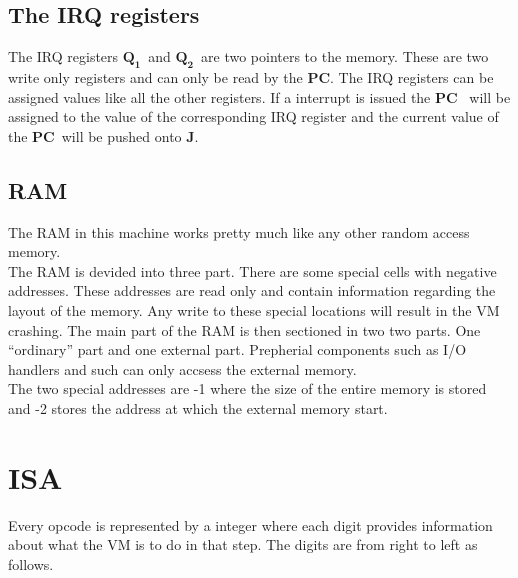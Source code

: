 \documentclass{article}
\newcommand{\q}{$\textbf{Q}_{\textbf{1}}$}
\newcommand{\qq}{$\textbf{Q}_{\textbf{2}}$}
\newcommand{\pc}{$\textbf{PC}$}
\newcommand{\J}{$\textbf{J}$}
\begin{document}
\subsection{The IRQ registers}
The IRQ registers \q \ and \qq \ are two pointers to the memory. These are two
write only registers and can only be read by the \pc. The IRQ registers can be
assigned values like all the other registers.  If a interrupt is issued the \pc
\ will be assigned to the value of the corresponding IRQ register and the current
value of the \pc \ will be pushed onto \J.

\subsection{RAM}
The RAM in this machine works pretty much like any other random access
memory.\\
The RAM is devided into three part. There are some special cells with negative
addresses. These addresses are read only and contain information regarding the
layout of the memory. Any write to these special locations will result in the
VM crashing. The main part of the RAM is then sectioned in two two parts. One
``ordinary'' part and one external part. Prepherial components such as I/O
handlers and such can only accsess the external memory.\\
The two special addresses are -1 where the size of the entire memory is stored
and -2 stores the address at which the external memory start.

\section{ISA}
Every opcode is represented by a integer where each digit provides
information about what the VM is to do in that step. The digits are from right
to left as follows.
\end{document}

